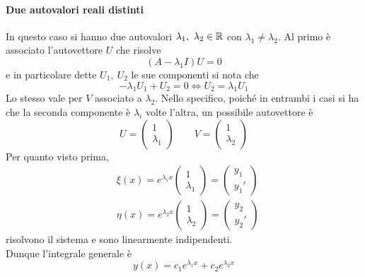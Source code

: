 \paragraph{Due autovalori reali distinti} In questo caso si hanno due autovalori $\lambda_1,\ \lambda_2 \in \mathbb{R}$ con $\lambda_1\neq \lambda_2$. Al primo è associato l'autovettore $U$ che risolve
\begin{equation}
    (A- \lambda_1 I)U=0
\end{equation}
e in particolare dette $U_1,\ U_2$ le sue componenti si nota che
\begin{equation}
    -\lambda_1 U_1 + U_2 =0 \iff U_2 = \lambda_1 U_1
\end{equation}
Lo stesso vale per $V$ associato a $\lambda_2$. Nello specifico, poiché in entrambi i casi si ha che la seconda componente è $\lambda_i$ volte l'altra, un possibile autovettore è
\begin{equation}
    U=\begin{pmatrix}
        1\\
        \lambda_1
    \end{pmatrix} \qquad
    V=\begin{pmatrix}
        1\\
        \lambda_2
    \end{pmatrix}
\end{equation}
Per quanto visto prima, 
\begin{align}
    &\xi(x)=e^{\lambda_1 x} \begin{pmatrix}
        1\\
        \lambda_1
    \end{pmatrix}=\begin{pmatrix}
        y_1\\
        y_1'
    \end{pmatrix}\\ 
    &\eta(x)= e^{\lambda_2 x} \begin{pmatrix}
        1\\
        \lambda_2
    \end{pmatrix}=\begin{pmatrix}
        y_2\\
        y_2'
        \end{pmatrix}
\end{align}
risolvono il sistema e sono linearmente indipendenti.\\
Dunque l'integrale generale è \begin{equation}
    y(x)=c_1e^{\lambda_1 x} + c_2 e^{\lambda_2 x}
\end{equation}
